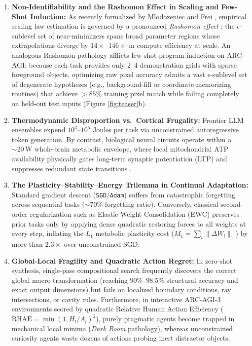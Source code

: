 \documentclass[10pt,a4paper]{article}
\begin{document}
\begin{enumerate}
    \item \textbf{Non-Identifiability and the Rashomon Effect in Scaling and Few-Shot Induction:} As recently formalized by Mlodozeniec and Frei \cite{mlodozeniec2026rashomon}, empirical scaling law estimation is governed by a pronounced \emph{Rashomon effect} \cite{breiman2001statistical}: the $\epsilon$-sublevel set of near-minimizers spans broad parameter regions whose extrapolations diverge by $14\times\text{--}146\times$ in compute efficiency at scale. An analogous Rashomon pathology afflicts few-shot program induction on ARC-AGI: because each task provides only $2\text{--}4$ demonstration grids with sparse foreground objects, optimizing raw pixel accuracy admits a vast $\epsilon$-sublevel set of degenerate hypotheses (e.g., background-fill or coordinate-memorizing routines) that achieve $>85\%$ training pixel match while failing completely on held-out test inputs (Figure \ref{fig:teaser}b).
    \item \textbf{Thermodynamic Disproportion vs.\ Cortical Frugality:} Frontier LLM ensembles expend $10^3\text{--}10^5$ Joules per task via unconstrained autoregressive token generation. By contrast, biological neural circuits operate within a $\sim 20\,\text{W}$ whole-brain metabolic envelope, where local mitochondrial ATP availability physically gates long-term synaptic potentiation (LTP) and suppresses redundant state transitions \cite{zainal2024syngap,vanrossum2025mistake}.
    \item \textbf{The Plasticity--Stability--Energy Trilemma in Continual Adaptation:} Standard gradient descent (\texttt{SGD}/\texttt{Adam}) suffers from catastrophic forgetting across sequential tasks ($\sim 70\%$ forgetting ratio). Conversely, classical second-order regularization such as Elastic Weight Consolidation (EWC) \cite{kirkpatrick2017overcoming} preserves prior tasks only by applying dense quadratic restoring forces to all weights at every step, inflating the $L_1$ metabolic plasticity cost ($M_1 = \sum_l \|\Delta W_l\|_1$) by more than $2.3\times$ over unconstrained SGD.
    \item \textbf{Global-Local Fragility and Quadratic Action Regret:} In zero-shot synthesis, single-pass compositional search frequently discovers the correct global macro-transformation (reaching $90\%\text{--}98.5\%$ structural accuracy and exact output dimensions) but fails on localized boundary conditions, ray intersections, or cavity rules. Furthermore, in interactive ARC-AGI-3 environments scored by quadratic Relative Human Action Efficiency ($\text{RHAE} = \min(1, H_l/A_l)^2$), purely pragmatic agents become trapped in mechanical local minima (\emph{Dark Room} pathology), whereas unconstrained curiosity agents waste dozens of actions probing inert distractor objects.
\end{enumerate}
\end{document}
